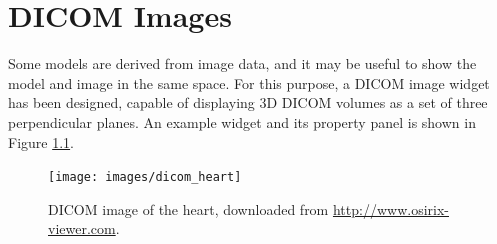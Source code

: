 
\let\olditem\item
\newcommand{\lstitem}[2][]{\olditem[{\protect\texttt{#1}}]\mbox{}\newline#2}
\newenvironment{lstdescription}{%
   \iflatexml
   \begin{description}
   \else
   \begin{description}[nolistsep]
   \fi
   \let\item\lstitem
}{\end{description}}

\newenvironment{tightemize}{%
   \iflatexml
   \begin{itemize}
   \else
   \begin{itemize}[nolistsep,noitemsep]
   \fi
}{\end{itemize}}


\chapter{DICOM Images}
\label{sec:dicom}

Some models are derived from image data, and it may be useful to show the model
and image in the same space.  For this purpose, a DICOM image widget has been designed,
capable of displaying 3D DICOM volumes as a set of three perpendicular planes.  An
example widget and its property panel is shown in Figure \ref{fig:dicom:heart}.

\begin{figure}[!ht]
   \begin{center}
      \texttt{[image: images/dicom\_heart]}
      \caption{DICOM image of the heart, 
      downloaded from \url{http://www.osirix-viewer.com}. \label{fig:dicom:heart}}
   \end{center}
\end{figure}

